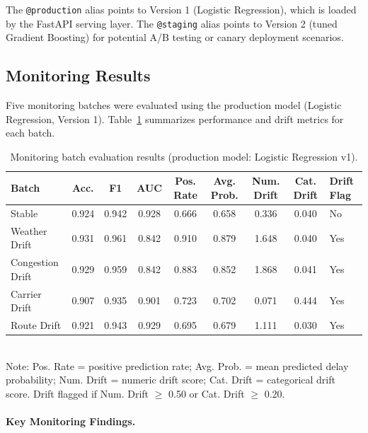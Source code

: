 \documentclass[11pt,a4paper]{article}
\begin{document}
The \texttt{@production} alias points to Version 1 (Logistic Regression), which is loaded by the FastAPI serving layer. The \texttt{@staging} alias points to Version 2 (tuned Gradient Boosting) for potential A/B testing or canary deployment scenarios.


\subsection{Monitoring Results}

Five monitoring batches were evaluated using the production model (Logistic Regression, Version 1). Table~\ref{tab:mon} summarizes performance and drift metrics for each batch.

\begin{table}[H]
\centering
\caption{Monitoring batch evaluation results (production model: Logistic Regression v1).}
\label{tab:mon}
\scriptsize
\begin{tabular}{lcccccccl}
\toprule
\textbf{Batch} & \textbf{Acc.} & \textbf{F1} & \textbf{AUC} & \textbf{Pos. Rate} & \textbf{Avg. Prob.} & \textbf{Num. Drift} & \textbf{Cat. Drift} & \textbf{Drift Flag} \\
\midrule
Stable            & 0.924 & 0.942 & 0.928 & 0.666 & 0.658 & 0.336 & 0.040 & No \\
Weather Drift     & 0.931 & 0.961 & 0.842 & 0.910 & 0.879 & 1.648 & 0.040 & Yes \\
Congestion Drift  & 0.929 & 0.959 & 0.842 & 0.883 & 0.852 & 1.868 & 0.041 & Yes \\
Carrier Drift     & 0.907 & 0.935 & 0.901 & 0.723 & 0.702 & 0.071 & 0.444 & Yes \\
Route Drift       & 0.921 & 0.943 & 0.929 & 0.695 & 0.679 & 1.111 & 0.030 & Yes \\
\bottomrule
\end{tabular}\\[4pt]
\scriptsize Note: Pos. Rate = positive prediction rate; Avg. Prob. = mean predicted delay probability; Num. Drift = numeric drift score; Cat. Drift = categorical drift score. Drift flagged if Num. Drift $\geq$ 0.50 or Cat. Drift $\geq$ 0.20.
\end{table}

\paragraph{Key Monitoring Findings.}
\end{document}
